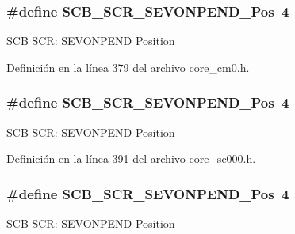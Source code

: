 \subsubsection[{\texorpdfstring{S\+C\+B\+\_\+\+S\+C\+R\+\_\+\+S\+E\+V\+O\+N\+P\+E\+N\+D\+\_\+\+Pos}{SCB_SCR_SEVONPEND_Pos}}]{\setlength{\rightskip}{0pt plus 5cm}\#define S\+C\+B\+\_\+\+S\+C\+R\+\_\+\+S\+E\+V\+O\+N\+P\+E\+N\+D\+\_\+\+Pos~4}\hypertarget{group___c_m_s_i_s___s_c_b_ga3bddcec40aeaf3d3a998446100fa0e44}{}\label{group___c_m_s_i_s___s_c_b_ga3bddcec40aeaf3d3a998446100fa0e44}
S\+CB S\+CR\+: S\+E\+V\+O\+N\+P\+E\+ND Position 

Definición en la línea 379 del archivo core\+\_\+cm0.\+h.

\subsubsection[{\texorpdfstring{S\+C\+B\+\_\+\+S\+C\+R\+\_\+\+S\+E\+V\+O\+N\+P\+E\+N\+D\+\_\+\+Pos}{SCB_SCR_SEVONPEND_Pos}}]{\setlength{\rightskip}{0pt plus 5cm}\#define S\+C\+B\+\_\+\+S\+C\+R\+\_\+\+S\+E\+V\+O\+N\+P\+E\+N\+D\+\_\+\+Pos~4}\hypertarget{group___c_m_s_i_s___s_c_b_ga3bddcec40aeaf3d3a998446100fa0e44}{}\label{group___c_m_s_i_s___s_c_b_ga3bddcec40aeaf3d3a998446100fa0e44}
S\+CB S\+CR\+: S\+E\+V\+O\+N\+P\+E\+ND Position 

Definición en la línea 391 del archivo core\+\_\+sc000.\+h.

\subsubsection[{\texorpdfstring{S\+C\+B\+\_\+\+S\+C\+R\+\_\+\+S\+E\+V\+O\+N\+P\+E\+N\+D\+\_\+\+Pos}{SCB_SCR_SEVONPEND_Pos}}]{\setlength{\rightskip}{0pt plus 5cm}\#define S\+C\+B\+\_\+\+S\+C\+R\+\_\+\+S\+E\+V\+O\+N\+P\+E\+N\+D\+\_\+\+Pos~4}\hypertarget{group___c_m_s_i_s___s_c_b_ga3bddcec40aeaf3d3a998446100fa0e44}{}\label{group___c_m_s_i_s___s_c_b_ga3bddcec40aeaf3d3a998446100fa0e44}
S\+CB S\+CR\+: S\+E\+V\+O\+N\+P\+E\+ND Position 

